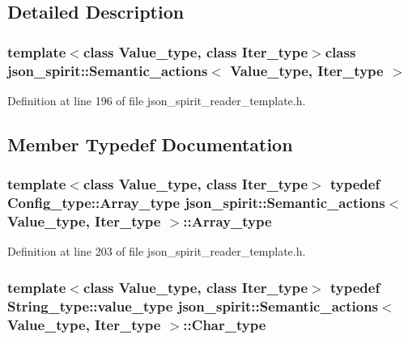 \subsection{Detailed Description}
\subsubsection*{template$<$class Value\+\_\+type, class Iter\+\_\+type$>$class json\+\_\+spirit\+::\+Semantic\+\_\+actions$<$ Value\+\_\+type, Iter\+\_\+type $>$}



Definition at line 196 of file json\+\_\+spirit\+\_\+reader\+\_\+template.\+h.



\subsection{Member Typedef Documentation}
\hypertarget{classjson__spirit_1_1_semantic__actions_ae45b36c7c39d00d084532a9de4aaf53e}{}
\subsubsection[{Array\+\_\+type}]{\setlength{\rightskip}{0pt plus 5cm}template$<$class Value\+\_\+type, class Iter\+\_\+type$>$ typedef Config\+\_\+type\+::\+Array\+\_\+type {\bf json\+\_\+spirit\+::\+Semantic\+\_\+actions}$<$ {\bf Value\+\_\+type}, Iter\+\_\+type $>$\+::{\bf Array\+\_\+type}}\label{classjson__spirit_1_1_semantic__actions_ae45b36c7c39d00d084532a9de4aaf53e}


Definition at line 203 of file json\+\_\+spirit\+\_\+reader\+\_\+template.\+h.

\hypertarget{classjson__spirit_1_1_semantic__actions_a14acf53ba844eb982d4e109687e501d2}{}
\subsubsection[{Char\+\_\+type}]{\setlength{\rightskip}{0pt plus 5cm}template$<$class Value\+\_\+type, class Iter\+\_\+type$>$ typedef String\+\_\+type\+::value\+\_\+type {\bf json\+\_\+spirit\+::\+Semantic\+\_\+actions}$<$ {\bf Value\+\_\+type}, Iter\+\_\+type $>$\+::{\bf Char\+\_\+type}}\label{classjson__spirit_1_1_semantic__actions_a14acf53ba844eb982d4e109687e501d2}


